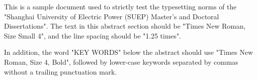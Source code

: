 \begin{enabstract}
This is a sample document used to strictly test the typesetting norms of the "Shanghai University of Electric Power (SUEP) Master's and Doctoral Dissertations". The text in this abstract section should be "Times New Roman, Size Small 4", and the line spacing should be "1.25 times". 

In addition, the word "KEY WORDS" below the abstract should use "Times New Roman, Size 4, Bold", followed by lower-case keywords separated by commas without a trailing punctuation mark.

\end{enabstract}

